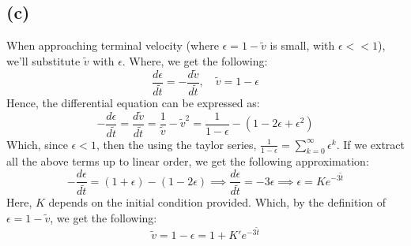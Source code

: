 \documentclass{article}
\begin{document}
\subsection*{(c)}
When approaching terminal velocity (where $\epsilon = 1-\tilde{v}$ is small, with $\epsilon<<1$), we'll substitute $\tilde{v}$ with $\epsilon$. Where, we get the following:
$$\frac{d\epsilon}{d\tilde{t}}=-\frac{d\tilde{v}}{d\tilde{t}},\quad \tilde{v}=1-\epsilon$$
Hence, the differential equation can be expressed as:
$$-\frac{d\epsilon}{d\tilde{t}}=\frac{d\tilde{v}}{d\tilde{t}}= \frac{1}{\tilde{v}}-\tilde{v}^2 = \frac{1}{1-\epsilon}-(1-2\epsilon+\epsilon^2)$$
Which, since $\epsilon<1$, then the using the taylor series, $\frac{1}{1-\epsilon} =\sum_{k=0}^{\infty}\epsilon^k$. If we extract all the above terms up to linear order, we get the following approximation:
$$-\frac{d\epsilon}{d\tilde{t}}=(1+\epsilon)-(1-2\epsilon)\implies \frac{d\epsilon}{d\tilde{t}}=-3\epsilon \implies \epsilon = Ke^{-3\tilde{t}}$$
Here, $K$ depends on the initial condition provided. Which, by the definition of $\epsilon=1-\tilde{v}$, we get the following:
$$\tilde{v}=1-\epsilon = 1+K'e^{-3\tilde{t}}$$
\end{document}

